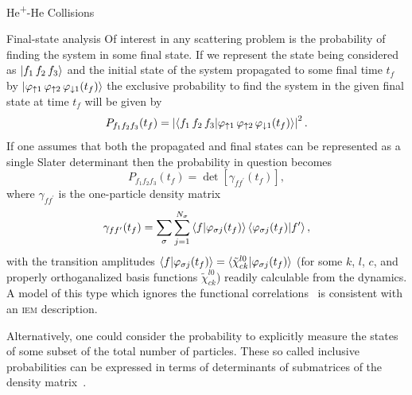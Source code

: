 \documentclass[letterpaper, 11 pt]{report}
\begin{document}
\begin{chapter}{\texorpdfstring{He\textsuperscript{+}}{He+}-He Collisions \label{chap:hephe}}
\begin{subsection}{Final-state analysis \label{sec:hephe-det}}
      Of interest in any scattering problem is the probability of finding the system in some final state.
      If we represent the state being considered as $\ket{f_1 \, f_2 \, f_3}$ and the initial state of
      the system propagated to some final time $t_f$ by $\ket{\varphi_{ \uparrow 1} \,
      \varphi_{\uparrow 2} \, \varphi_{\downarrow 1} (t_f)}$ the exclusive probability to find the
      system in the given final state at time $t_f$ will be given by
      \begin{equation} \label{eq:finalProb}
         P_{f_1 f_2 f_3}(t_f) = \left| \braket{ f_1 \, f_2 \, f_3 | \varphi_{ \uparrow 1} \,
                                       \varphi_{\uparrow 2} \, \varphi_{\downarrow 1} (t_f) } \right|^2.
      \end{equation}
      If one assumes that both the propagated and final states can be represented as a single Slater
      determinant then the probability in question becomes
      \begin{equation} \label{eq:detProb}
         P_{f_1 f_2 f_3}(t_f) = \det \left[ \gamma_{f f^\prime}(t_f) \right],
      \end{equation}
      where $\gamma_{f f^\prime}$ is the one-particle density matrix
      \begin{equation} \label{eq:denmat}
         \gamma_{f f^\prime}(t_f) = \sum\limits_{\sigma} \sum\limits_{j = 1}^{N_\sigma}
                               \braket{f | \varphi_{\sigma j}(t_f)}
                               \braket{\varphi_{\sigma j}(t_f) | f^\prime},
      \end{equation}
      with the transition amplitudes $\braket{f | \varphi_{\sigma j}(t_f)} =
      \braket{\tilde{\chi}^{l0}_{c k} | \varphi_{\sigma j}(t_f)}$ (for some $k$, $l$, $c$, and properly
      orthoganalized basis functions $\tilde{\chi}^{l0}_{c k}$) readily calculable from the dynamics. A
      model of this type which ignores the functional correlations~\cite{p-he2p-he} is consistent with
      an \textsc{iem} description.

      Alternatively, one could consider the probability to explicitly measure the states of some subset
      of the total number of particles. These so called inclusive probabilities can be expressed in
      terms of determinants of submatrices of the density matrix~\cite{inc-prob}.
 

\end{subsection}
\end{chapter}
\end{document}
